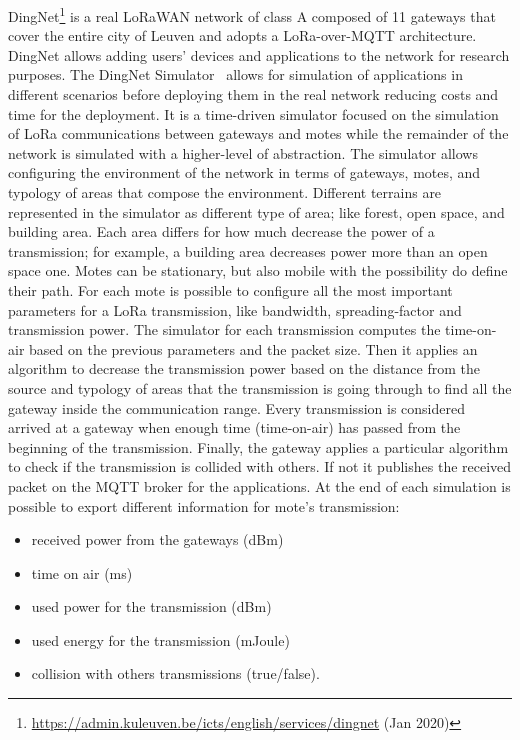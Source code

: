 DingNet\footnote{\href{https://admin.kuleuven.be/icts/english/services/dingnet}{https://admin.kuleuven.be/icts/english/services/dingnet} (Jan 2020)} is a real LoRaWAN network of class A composed of 11 gateways that cover the entire city of Leuven and adopts a LoRa-over-MQTT architecture. 
% 
DingNet allows adding users' devices and applications to the network for research purposes.
% 
The DingNet Simulator~\cite{inproceedings} allows for simulation of applications in different scenarios before deploying them in the real network reducing costs and time for the deployment.
% 
It is a time-driven simulator focused on the simulation of LoRa communications between gateways and motes while the remainder of the network is simulated with a higher-level of abstraction. 
% 
The simulator allows configuring the environment of the network in terms of gateways, motes, and typology of areas that compose the environment. 
% 
Different terrains are represented in the simulator as different type of area; like forest, open space, and building area. 
Each area differs for how much decrease the power of a transmission; for example, a building area decreases power more than an open space one.
% 
Motes can be stationary, but also mobile with the possibility do define their path.
% 
For each mote is possible to configure all the most important parameters for a LoRa transmission, like bandwidth, spreading-factor and transmission power. 
% 
The simulator for each transmission computes the time-on-air based on the previous parameters and the packet size. 
% 
Then it applies an algorithm to decrease the transmission power based on the distance from the source and typology of areas that the transmission is going through to find all the gateway inside the communication range.
% 
Every transmission is considered arrived at a gateway when enough time (time-on-air) has passed from the beginning of the transmission. 
Finally, the gateway applies a particular algorithm to check if the transmission is collided with others. If not it publishes the received packet on the MQTT broker for the applications.
%
At the end of each simulation is possible to export different information for mote's transmission:
\begin{itemize}
    \item received power from the gateways (dBm)
    \item time on air (ms)
    \item used power for the transmission (dBm)
    \item used energy for the transmission (mJoule)
    \item collision with others transmissions (true/false).
\end{itemize}

